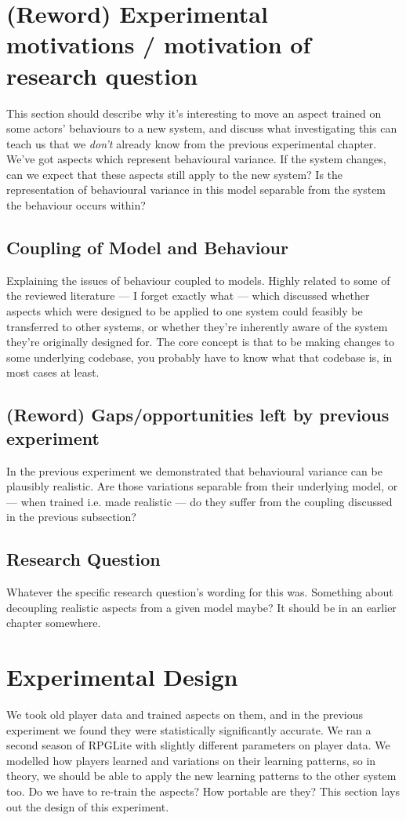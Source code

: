 \section{(Reword) Experimental motivations / motivation of research question}
This section should describe why it's interesting to move an aspect trained on
some actors' behaviours to a new system, and discuss what investigating this can
teach us that we \emph{don't} already know from the previous experimental
chapter. We've got aspects which represent behavioural variance. If the system
changes, can we expect that these aspects still apply to the new system? Is the
representation of behavioural variance in this model separable from the system
the behaviour occurs within?

\subsection{Coupling of Model and Behaviour}
Explaining the issues of behaviour coupled to models. Highly related to some of
the reviewed literature --- I forget exactly what --- which discussed whether
aspects which were designed to be applied to one system could feasibly be
transferred to other systems, or whether they're inherently aware of the system
they're originally designed for. The core concept is that to be making changes
to some underlying codebase, you probably have to know what that codebase is, in
most cases at least.

\subsection{(Reword) Gaps/opportunities left by previous experiment}
In the previous experiment we demonstrated that behavioural variance can be
plausibly realistic. Are those variations separable from their underlying model,
or --- when trained i.e. made realistic --- do they suffer from the coupling
discussed in the previous subsection?

\subsection{Research Question}
Whatever the specific research question's wording for this was. Something about
decoupling realistic aspects from a given model maybe? It should be in an
earlier chapter somewhere.

\section{Experimental Design}
We took old player data and trained aspects on them, and in the previous
experiment we found they were statistically significantly accurate. We ran a
second season of RPGLite with slightly different parameters on player data. We
modelled how players learned and variations on their learning patterns, so in
theory, we should be able to apply the new learning patterns to the other system
too. Do we have to re-train the aspects? How portable are they? This section
lays out the design of this experiment.


